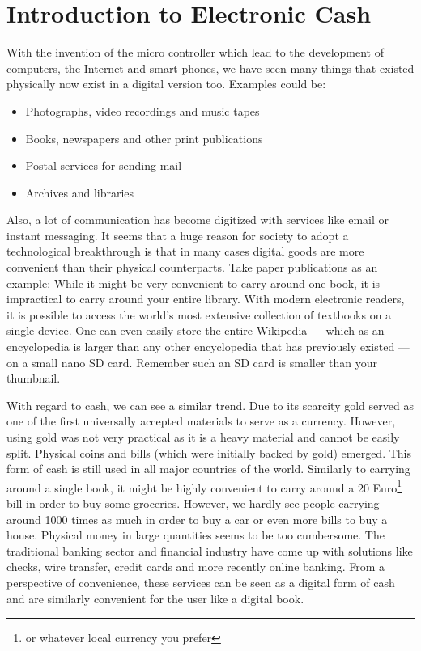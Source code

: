 \documentclass[a4paper,12pt,oneside,openany]{book}
\begin{document}
\section{Introduction to Electronic Cash}
With the invention of the micro controller which lead to the development of computers, the Internet and smart phones, we have seen many things that existed physically now exist in a digital version too.
Examples could be:
\begin{itemize}
\item Photographs, video recordings and music tapes
\item Books, newspapers and other print publications
\item Postal services for sending mail
\item Archives and libraries
\end{itemize}

Also, a lot of communication has become digitized with services like email or instant messaging.
It seems that a huge reason for society to adopt a technological breakthrough is that in many cases digital goods are more convenient than their physical counterparts.
Take paper publications as an example: While it might be very convenient to carry around one book, it is impractical to carry around your entire library.
With modern electronic readers, it is possible to access the world's most extensive collection of textbooks on a single device.
One can even easily store the entire Wikipedia --- which as an encyclopedia is larger than any other encyclopedia that has previously existed --- on a small nano SD card.
Remember such an SD card is smaller than your thumbnail.

With regard to cash, we can see a similar trend.
Due to its scarcity gold served as one of the first universally accepted materials to serve as a currency.
However, using gold was not very practical as it is a heavy material and cannot be easily split.
Physical coins and bills (which were initially backed by gold) emerged.
This form of cash is still used in all major countries of the world.
Similarly to carrying around a single book, it might be highly convenient to carry around a 20 Euro\footnote{or whatever local currency you prefer} bill in order to buy some groceries. However, we hardly see people carrying around 1000 times as much in order to buy a car or even more bills to buy a house.
Physical money in large quantities seems to be too cumbersome. 
The traditional banking sector and financial industry have come up with solutions like checks, wire transfer, credit cards and more recently online banking.
From a perspective of convenience, these services can be seen as a digital form of cash and are similarly convenient for the user like a digital book.
\end{document}
